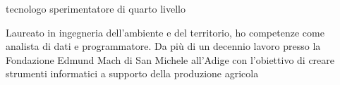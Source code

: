 \documentclass{curriculum}
\begin{document}
   {tecnologo sperimentatore di quarto livello}
  
    Laureato in ingegneria dell'ambiente e del territorio, ho competenze come analista di dati e programmatore.
    Da più di un decennio lavoro presso la Fondazione Edmund Mach di San Michele all'Adige con l'obiettivo di creare strumenti informatici a supporto della produzione agricola
\end{document}
